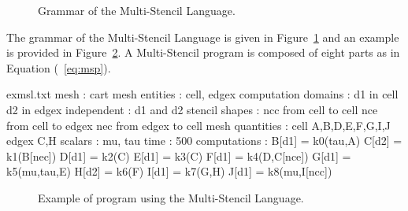 \begin{figure}[hbt]
  \hspace{5mm}
  \begin{minipage}[!h]{0.98\textwidth}
    {}   
    \caption{Grammar of the Multi-Stencil Language. \label{fig:grammar}}
  \end{minipage}
\end{figure}

The grammar of the Multi-Stencil Language is given in Figure~\ref{fig:grammar} and an example is provided in Figure~\ref{fig:exmsl}. A Multi-Stencil program is composed of eight parts as in Equation (~\ref{eq:msp}).

\begin{filecontents*}{exmsl.txt}
mesh : cart
mesh entities : cell, edgex
computation domains :
  d1 in cell
  d2 in edgex
independent :
  d1 and d2
stencil shapes : 
  ncc from cell to cell
  nce from cell to edgex
  nec from edgex to cell
mesh quantities :
  cell A,B,D,E,F,G,I,J
  edgex C,H
scalars : mu, tau
time : 500
computations :
  B[d1] = k0(tau,A)
  C[d2] = k1(B[nec])
  D[d1] = k2(C)
  E[d1] = k3(C)
  F[d1] = k4(D,C[nce])
  G[d1] = k5(mu,tau,E)
  H[d2] = k6(F)
  I[d1] = k7(G,H)
  J[d1] = k8(mu,I[ncc])
\end{filecontents*}

\begin{figure}[!h]
  \hspace{5mm}
  \begin{minipage}[!h]{0.98\textwidth}
    {}   
    \caption{Example of program using the Multi-Stencil Language. \label{fig:exmsl}}
  \end{minipage}
\end{figure}

